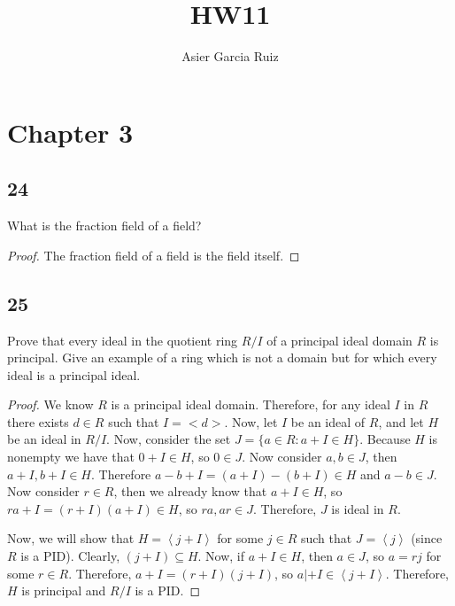 \documentclass{article}
\title{HW11}
\author{Asier Garcia Ruiz}
\newcommand{\gen}[1]{\left\langle #1 \right\rangle}
\newenvironment{hwproof}[1]
{
    #1
    \begin{proof}
}{
    \end{proof}
}
\begin{document}
\maketitle
\section*{Chapter 3}
\subsection*{24}
\begin{hwproof}
    {
        What is the fraction field of a field?
    }
    The fraction field of a field is the field itself.
\end{hwproof}

\subsection*{25}
\begin{hwproof}
    {
        Prove that every ideal in the quotient ring $R/I$ of a principal ideal
        domain $R$ is principal. Give an example of a ring which is not a
        domain but for which every ideal is a principal ideal.
    }
    We know $R$ is a principal ideal domain. Therefore, for any ideal $I$ in $R$
    there exists $d \in R$ such that $I = <d>$. Now, let $I$ be an ideal of $R$, 
    and let $H$ be an ideal in $R/I$. Now, consider the set
    $J = \{a \in R : a + I \in H\}$. Because $H$ is nonempty we have that
    $0 + I \in H$, so $0 \in J$. Now consider $a,b \in J$, then
    $a + I, b + I \in H$. Therefore $a - b + I = (a + I) - (b + I) \in H$ and 
    $a - b \in J$. Now consider $r \in R$, then we already know that $a + I \in H$,
    so $ra + I = (r + I)(a + I) \in H$, so $ra, ar \in J$. Therefore, $J$ is ideal
    in $R$.

    Now, we will show that $H = \gen{j + I}$ for some $j \in R$ such that 
    $J = \gen{j}$ (since $R$ is a PID). Clearly, $(j + I) \subseteq H$.
    Now, if $a + I \in H$, then $a \in J$, so $a = rj$ for some $r \in R$.
    Therefore, $a + I = (r + I)(j + I)$, so $a | + I \in \gen{j + I}$.
    Therefore, $H$ is principal and $R/I$ is a PID.
\end{hwproof}
\end{document}
